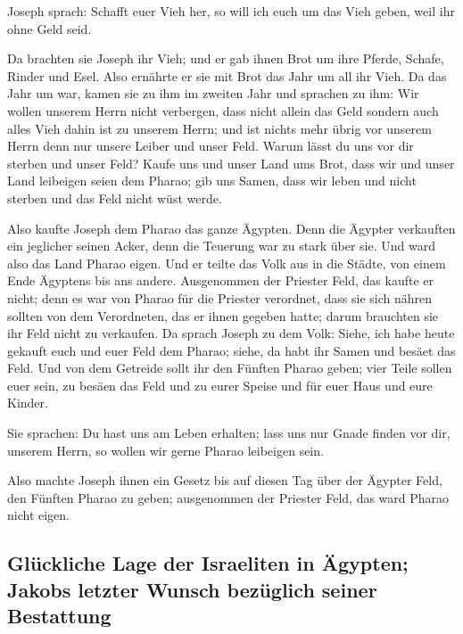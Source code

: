 Joseph sprach: Schafft euer Vieh her, so will ich euch
um das Vieh geben, weil ihr ohne Geld seid.

 Da brachten sie Joseph ihr Vieh; und er gab ihnen Brot
um ihre Pferde, Schafe, Rinder und Esel. Also ernährte er sie mit Brot
das Jahr um all ihr Vieh.  Da das Jahr um war, kamen sie
zu ihm im zweiten Jahr und sprachen zu ihm: Wir wollen unserem Herrn
nicht verbergen, dass nicht allein das Geld sondern auch alles Vieh
dahin ist zu unserem Herrn; und ist nichts mehr übrig vor unserem Herrn
denn nur unsere Leiber und unser Feld.  Warum lässt du
uns vor dir sterben und unser Feld? Kaufe uns und unser Land ums Brot,
dass wir und unser Land leibeigen seien dem Pharao; gib uns Samen, dass
wir leben und nicht sterben und das Feld nicht wüst werde.

 Also kaufte Joseph dem Pharao das ganze Ägypten. Denn
die Ägypter verkauften ein jeglicher seinen Acker, denn die Teuerung war
zu stark über sie. Und ward also das Land Pharao eigen. 
Und er teilte das Volk aus in die Städte, von einem Ende Ägyptens bis
ans andere.  Ausgenommen der Priester Feld, das kaufte er
nicht; denn es war von Pharao für die Priester verordnet, dass sie sich
nähren sollten von dem Verordneten, das er ihnen gegeben hatte; darum
brauchten sie ihr Feld nicht zu verkaufen.  Da sprach
Joseph zu dem Volk: Siehe, ich habe heute gekauft euch und euer Feld dem
Pharao; siehe, da habt ihr Samen und besäet das Feld. 
Und von dem Getreide sollt ihr den Fünften Pharao geben; vier Teile
sollen euer sein, zu besäen das Feld und zu eurer Speise und für euer
Haus und eure Kinder.

 Sie sprachen: Du hast uns am Leben erhalten; lass uns
nur Gnade finden vor dir, unserem Herrn, so wollen wir gerne Pharao
leibeigen sein.

 Also machte Joseph ihnen ein Gesetz bis auf diesen Tag
über der Ägypter Feld, den Fünften Pharao zu geben; ausgenommen der
Priester Feld, das ward Pharao nicht eigen.

\hypertarget{gluxfcckliche-lage-der-israeliten-in-uxe4gypten-jakobs-letzter-wunsch-bezuxfcglich-seiner-bestattung}{%
\subsection{Glückliche Lage der Israeliten in Ägypten; Jakobs letzter
Wunsch bezüglich seiner
Bestattung}\label{gluxfcckliche-lage-der-israeliten-in-uxe4gypten-jakobs-letzter-wunsch-bezuxfcglich-seiner-bestattung}}

